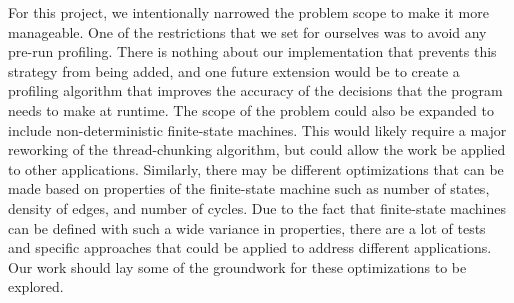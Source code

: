 \documentclass[11pt]{sigplanconf}
\begin{document}
For this project, we intentionally narrowed the problem scope to make it more manageable. One of the restrictions that we set for ourselves was to avoid any pre-run profiling. There is nothing about our implementation that prevents this strategy from being added, and one future extension would be to create a profiling algorithm that improves the accuracy of the decisions that the program needs to make at runtime. The scope of the problem could also be expanded to include non-deterministic finite-state machines. This would likely require a major reworking of the thread-chunking algorithm, but could allow the work be applied to other applications. Similarly, there may be different optimizations that can be made based on properties of the finite-state machine such as number of states, density of edges, and number of cycles. Due to the fact that finite-state machines can be defined with such a wide variance in properties, there are a lot of tests and specific approaches that could be applied to address different applications. Our work should lay some of the groundwork for these optimizations to be explored.







%




\end{document}
